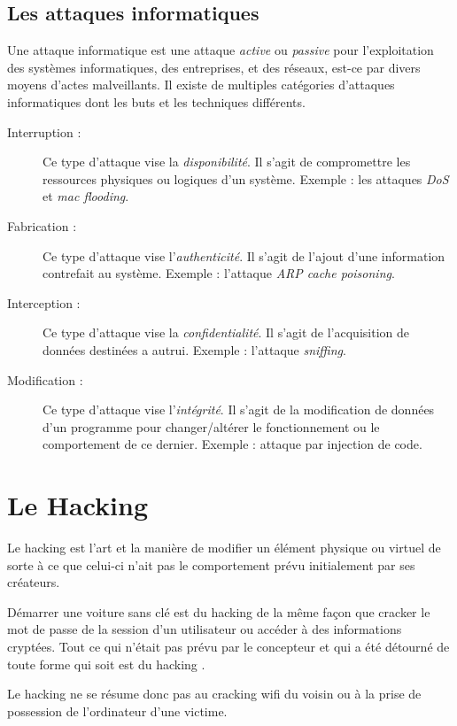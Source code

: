    \subsection{Les attaques informatiques}
    Une attaque informatique est une attaque \emph{active} ou \emph{passive} pour l'exploitation des systèmes informatiques, 
    des entreprises, et des réseaux, est-ce par divers moyens d’actes malveillants. 
    Il existe de multiples catégories d’attaques informatiques dont les buts et les techniques différents. %
    \begin{description}
        \item[Interruption :] Ce type d'attaque vise la \emph{disponibilité}. Il s’agit de compromettre les 
            ressources physiques ou logiques d'un système. Exemple : les attaques \emph{DoS} et \emph{mac flooding}.
        \item[Fabrication :] Ce type d’attaque vise l'\emph{authenticité}. Il s'agit de l’ajout d’une 
            information contrefait au système. Exemple : l'attaque \emph{ARP cache poisoning}. %
        \item[Interception :] Ce type d’attaque vise la \emph{confidentialité}. Il s’agit de l'acquisition de données 
            destinées a autrui. Exemple : l’attaque \emph{sniffing}. %
        \item[Modification :] Ce type d’attaque vise l'\emph{intégrité}. Il s’agit de la modification 
            de données d’un programme pour changer/altérer le fonctionnement ou le comportement de ce dernier. 
            Exemple : attaque par injection de code. %
    \end{description}
    
\section{Le Hacking}
    Le hacking \cite{bases_hacking} est l'art et la manière de modifier un élément physique ou virtuel 
    de sorte à ce que celui-ci n'ait pas le comportement prévu initialement par ses créateurs. %

    Démarrer une voiture sans clé est du hacking de la même façon que cracker le mot de passe de la session 
    d'un utilisateur ou accéder à des informations cryptées. Tout ce qui n'était pas prévu par le concepteur et 
    qui a été détourné de toute forme qui soit est du hacking  \cite{hacking} . %

    Le hacking ne se résume donc pas au cracking wifi du voisin ou à la prise de possession de l'ordinateur 
    d'une victime. %

